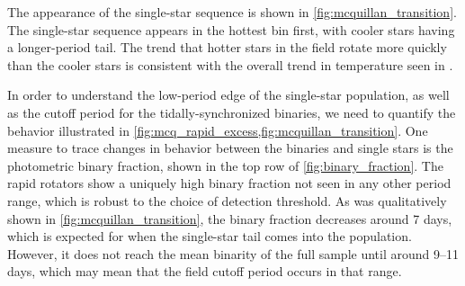 \documentclass[manuscript]{aastex6}
\begin{document}
\begin{figure*}[htb]
    \centering
    \caption{Same as \cref{fig:mcq_rapid_excess} except with the period ranges
    5--7 day, 7--9 day, 9--11 day, 11--13 days.}
    \label{fig:mcquillan_transition}
\end{figure*}

The appearance of the single-star sequence is shown in
\cref{fig:mcquillan_transition}. The single-star sequence appears in the
hottest bin first, with cooler stars having a longer-period tail. The trend
that hotter stars in the field rotate more quickly than the cooler stars 
is consistent with the overall trend in temperature seen in 
\citet{McQuillan14}.

\begin{figure*}[htb]
    \centering
    \caption{\emph{Top Left:} The photometric binary fraction as a function of 
        period for the inclusive photometric binary threshold (\(\Delta K <
        -0.26\) mag). The photometric binary fraction
        for the full sample analyzed by \citet{McQuillan14} is shown as the
        dotted line. Error bars are \(1 \sigma\) binomial confidence
        intervals. \emph{Top Right:} Same as the previous plot, except using
        the more conservative threshold (\(\Delta K < -0.39\) mag). \emph{Bottom
        left:} The period distribution of the photometric binary (solid green) 
        and photometric single (dashed purple) samples, each normalized by the 
        total number of photometric binaries and photometric single stars 
        analyzed by \citet{McQuillan14}, respectively, using the inclusive
        photometric binary threshold. \emph{Bottom Right:}
        Same as the previous plot, except with the more conservative vertical
        displacement threshold. Error bars are 1-\(\sigma\) Poisson confidence 
    intervals.}\label{fig:binary_fraction}
\end{figure*}

In order to understand the low-period edge of the single-star population, as
well as the cutoff period for the tidally-synchronized binaries, we need to
quantify the behavior illustrated in
\cref{fig:mcq_rapid_excess,fig:mcquillan_transition}. One measure to trace
changes in behavior between the binaries and single stars is the photometric
binary fraction, shown in the top row of \cref{fig:binary_fraction}. The rapid 
rotators show a uniquely high binary fraction not seen in any other period 
range, which is robust to the choice of detection threshold. As was 
qualitatively shown in \cref{fig:mcquillan_transition}, the binary fraction 
decreases around 7 days, which is expected for when the single-star tail comes 
into the population. However, it does not reach the mean binarity of the full 
sample until around 9--11 days, which may mean that the field cutoff period
occurs in that range.
\end{document}
